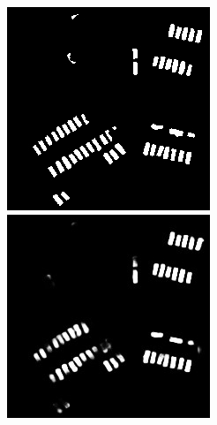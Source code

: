 \documentclass{kththesis}
\begin{document}
\begin{figure}[H]
  \includegraphics[width=\linewidth]{gan_vs_class/label_2}
\endminipage\hfill
{}
  \includegraphics[width=\linewidth]{gan_vs_class/class_2}

\end{figure}
\end{document}

